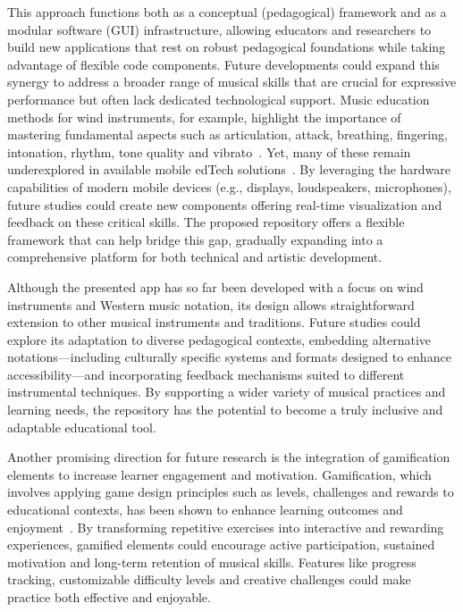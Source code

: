 \documentclass[runningheads]{llncs}
\begin{document}
This approach functions both as a conceptual (pedagogical) framework and as a modular software (GUI) infrastructure, allowing educators and researchers to build new applications that rest on robust pedagogical foundations while taking advantage of flexible code components. Future developments could expand this synergy to address a broader range of musical skills that are crucial for expressive performance but often lack dedicated technological support. Music education methods for wind instruments, for example, highlight the importance of mastering fundamental aspects such as articulation, attack, breathing, fingering, intonation, rhythm, tone quality and vibrato~\cite{Arban82,Westphal90,Weisberg07}. Yet, many of these remain underexplored in available mobile edTech solutions~\cite{Acquilino22}. By leveraging the hardware capabilities of modern mobile devices (e.g., displays, loudspeakers, microphones), future studies could create new components offering real-time visualization and feedback on these critical skills. The proposed repository offers a flexible framework that can help bridge this gap, gradually expanding into a comprehensive platform for both technical and artistic development.

Although the presented app has so far been developed with a focus on wind instruments and Western music notation, its design allows straightforward extension to other musical instruments and traditions. Future studies could explore its adaptation to diverse pedagogical contexts, embedding alternative notations---including culturally specific systems and formats designed to enhance accessibility---and incorporating feedback mechanisms suited to different instrumental techniques. By supporting a wider variety of musical practices and learning needs, the repository has the potential to become a truly inclusive and adaptable educational tool.

Another promising direction for future research is the integration of gamification elements to increase learner engagement and motivation. Gamification, which involves applying game design principles such as levels, challenges and rewards to educational contexts, has been shown to enhance learning outcomes and enjoyment~\cite{Deterding11}. By transforming repetitive exercises into interactive and rewarding experiences, gamified elements could encourage active participation, sustained motivation and long-term retention of musical skills. Features like progress tracking, customizable difficulty levels and creative challenges could make practice both effective and enjoyable.
\end{document}
